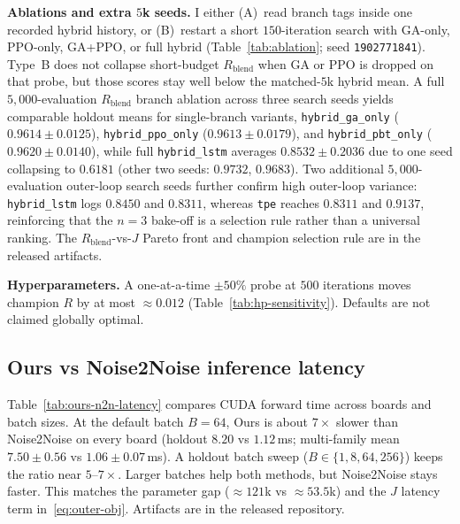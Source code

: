 \textbf{Ablations and extra $5$k seeds.}
I either (A)~read branch tags inside one recorded hybrid history, or
(B)~restart a short $150$-iteration search with GA-only, PPO-only, GA+PPO, or full hybrid
(Table~\ref{tab:ablation}; seed \texttt{1902771841}).
Type~B does not collapse short-budget $R_{\mathrm{blend}}$ when GA or PPO is dropped on that probe,
but those scores stay well below the matched-$5$k hybrid mean.
A full $5{,}000$-evaluation $R_{\mathrm{blend}}$ branch ablation across three search seeds yields comparable holdout means for single-branch variants, \texttt{hybrid\_ga\_only} ($0.9614{\pm}0.0125$), \texttt{hybrid\_ppo\_only} ($0.9613{\pm}0.0179$), and \texttt{hybrid\_pbt\_only} ($0.9620{\pm}0.0140$), while full \texttt{hybrid\_lstm} averages $0.8532{\pm}0.2036$ due to one seed collapsing to $0.6181$ (other two seeds: $0.9732$, $0.9683$).
Two additional $5{,}000$-evaluation outer-loop search seeds further confirm high outer-loop variance: \texttt{hybrid\_lstm} logs $0.8450$ and $0.8311$, whereas \texttt{tpe} reaches $0.8311$ and $0.9137$, reinforcing that the $n{=}3$ bake-off is a selection rule rather than a universal ranking.
The $R_{\mathrm{blend}}$-vs-$J$ Pareto front and champion selection rule are in the released artifacts.

\textbf{Hyperparameters.}
A one-at-a-time $\pm 50\%$ probe at $500$ iterations moves champion $R$ by at most ${\approx}0.012$
(Table~\ref{tab:hp-sensitivity}).
Defaults are not claimed globally optimal.

\subsection{Ours vs Noise2Noise inference latency}
\label{sec:ours-n2n-latency}

Table~\ref{tab:ours-n2n-latency} compares CUDA forward time across boards and batch sizes.
At the default batch $B{=}64$, Ours is about $7\times$ slower than Noise2Noise on every board
(holdout $8.20$ vs $1.12$\,ms; multi-family mean $7.50{\pm}0.56$ vs $1.06{\pm}0.07$\,ms).
A holdout batch sweep ($B\in\{1,8,64,256\}$) keeps the ratio near $5$--$7\times$.
Larger batches help both methods, but Noise2Noise stays faster.
This matches the parameter gap (${\approx}121$k vs ${\approx}53.5$k) and the $J$ latency term in~\eqref{eq:outer-obj}.
Artifacts are in the released repository.

